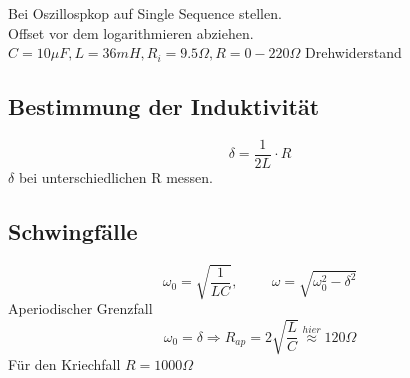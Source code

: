 \documentclass[12pt,a4paper]{article}
\begin{document}
Bei Oszillospkop auf Single Sequence stellen.\\
Offset vor dem logarithmieren abziehen.\\
$C=10\mu F, L=36mH, R_i=9.5 \Omega, R=0-220 \Omega$ Drehwiderstand
\subsection{Bestimmung der Induktivität}
\begin{equation}
\delta=\frac{1}{2L}\cdot R
\end{equation}
$\delta$ bei unterschiedlichen R messen.
\subsection{Schwingfälle}
\begin{equation}
\omega_0=\sqrt{\frac{1}{LC}}, \hspace{1cm} \omega=\sqrt{\omega_0^2-\delta^2}
\end{equation}
Aperiodischer Grenzfall
\begin{equation}
\omega_0=\delta \Rightarrow R_{ap}=2\sqrt{\frac{L}{C}}\stackrel{hier}{\approx}120\Omega
\end{equation}
Für den Kriechfall $R=1000 \Omega$
\end{document}
